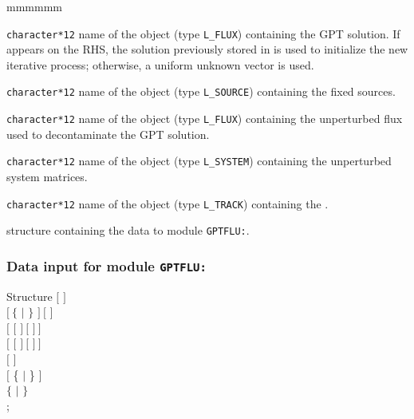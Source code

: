 \begin{ListeDeDescription}{mmmmmm}

\item[\dusa{FLUX\_GPT}] {\tt character*12} name of the  object (type {\tt L\_FLUX}) containing the GPT solution. If  appears on the RHS, the solution previously stored in  is used to initialize the new iterative process; otherwise, a uniform unknown vector is used.

\item[\dusa{GPT}] {\tt character*12} name of the  object (type {\tt L\_SOURCE}) containing the fixed sources.

\item[\dusa{FLUX0}] {\tt character*12} name of the  object (type {\tt L\_FLUX}) containing the unperturbed flux used to decontaminate the GPT solution.

\item[\dusa{SYST}] {\tt character*12} name of the  object (type {\tt L\_SYSTEM}) containing the unperturbed system matrices.

\item[\dusa{TRACK}] {\tt character*12} name of the  object (type {\tt L\_TRACK}) containing the .

\item[\dstr{gptflu\_data}] structure containing the data to module {\tt GPTFLU:}\label{sect:gptflu_data}.

\end{ListeDeDescription}

\vskip 0.2cm

\subsubsection{Data input for module {\tt GPTFLU:}}\label{sect:gptflu_data}

\begin{DataStructure}{Structure }
$[$   $]$ \\
$[~\{$  $|$  $\}$   $]~[$   $]$ \\
$[$   $[$  $]~[$  $]~]$ \\
$[$   $[$  $]~[$  $]~]$ \\
$[$   $]$ \\
$[$ \{  $|$  \} $]$ \\
 $\{$  $|$   $\}$ \\
;
\end{DataStructure}

